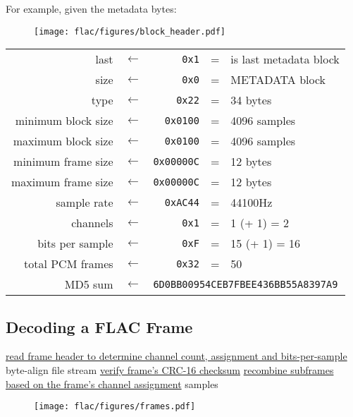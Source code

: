 \clearpage

For example, given the metadata bytes:
\begin{figure}[h]
\texttt{[image: flac/figures/block\_header.pdf]}
\end{figure}
\par
\noindent
\begin{tabular}{rcrcl}
\textsf{last} & $\leftarrow$ & \texttt{0x1} & = & is last metadata block \\
\textsf{size} & $\leftarrow$ & \texttt{0x0} & = & METADATA block \\
\textsf{type} & $\leftarrow$ & \texttt{0x22} & = & 34 bytes \\
\textsf{minimum block size} & $\leftarrow$ & \texttt{0x0100} & = & 4096 samples \\
\textsf{maximum block size} & $\leftarrow$ & \texttt{0x0100} & = & 4096 samples \\
\textsf{minimum frame size} & $\leftarrow$ & \texttt{0x00000C} & = & 12 bytes \\
\textsf{maximum frame size} & $\leftarrow$ & \texttt{0x00000C} & = & 12 bytes \\
\textsf{sample rate} & $\leftarrow$ & \texttt{0xAC44} & = & 44100Hz \\
\textsf{channels} & $\leftarrow$ & \texttt{0x1} & = & 1 (+ 1) = 2 \\
\textsf{bits per sample} & $\leftarrow$ & \texttt{0xF} & = & 15 (+ 1) = 16 \\
\textsf{total PCM frames} & $\leftarrow$ & \texttt{0x32} & = & 50 \\
\textsf{MD5 sum} & $\leftarrow$ & \multicolumn{3}{l}{\texttt{6D0BB00954CEB7FBEE436BB55A8397A9}} \\
\end{tabular}

\clearpage

\subsection{Decoding a FLAC Frame}
\label{flac:decode_frame}
\hyperref[flac:read_frame_header]{read frame header to determine channel count, assignment and bits-per-sample}\;
byte-align file stream\;
\hyperref[flac:verify_crc16]{verify frame's CRC-16 checksum}\;
\hyperref[flac:recombine_subframes]{recombine subframes based on the frame's channel assignment}\;
\Return samples\;
\EALGORITHM
\begin{figure}[h]
\texttt{[image: flac/figures/frames.pdf]}
\end{figure}

